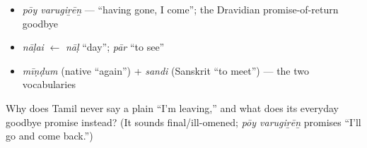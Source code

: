 \begin{grammarlens}[title={What you've built — roots you now carry}]
\begin{itemize}
\raggedright
  \item \emph{pōy varugiṟēṉ} — \textquotedblleft{}having gone, I come\textquotedblright{}; the Dravidian promise-of-return goodbye
  \item \emph{nāḷai} $\leftarrow$ \emph{nāḷ} \textquotedblleft{}day\textquotedblright{}; \emph{pār} \textquotedblleft{}to see\textquotedblright{}
  \item \emph{mīṇḍum} (native \textquotedblleft{}again\textquotedblright{}) + \emph{sandi} (Sanskrit \textquotedblleft{}to meet\textquotedblright{}) — the two vocabularies
\end{itemize}
\end{grammarlens}

\begin{tcolorbox}[breakable,colback=teal!4,colframe=teal!35!black,title={Before you move on}]
Why does Tamil never say a plain \textquotedblleft{}I'm leaving,\textquotedblright{} and what does its everyday goodbye promise instead? (It sounds final/ill-omened; \emph{pōy varugiṟēṉ} promises \textquotedblleft{}I'll go and come back.\textquotedblright{})
\end{tcolorbox}
